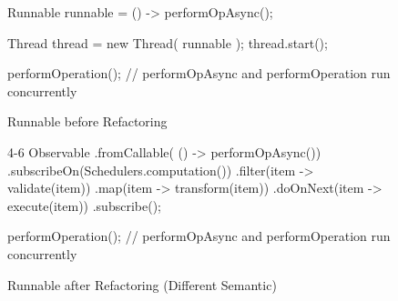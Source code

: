 \begin{figure}[H]
\begin{minipage}{0.48\textwidth}
\begin{sourcecode}
\begin{javacode}{}
Runnable runnable = () -> performOpAsync();

Thread thread = new Thread( runnable );
thread.start();

performOperation();
// performOpAsync and performOperation run concurrently
\end{javacode}
\caption{Runnable before Refactoring}
\label{code:con-runnable-before}
\end{sourcecode}
\end{minipage}\hspace{0.7cm}
\begin{minipage}{0.48\textwidth}
\begin{sourcecode}
\begin{javacode}{4-6}
Observable
        .fromCallable( () -> performOpAsync())
        .subscribeOn(Schedulers.computation())
        .filter(item -> validate(item))
        .map(item -> transform(item))
        .doOnNext(item -> execute(item))
        .subscribe();

performOperation();
// performOpAsync and performOperation run concurrently
\end{javacode}
\caption{Runnable after Refactoring (Different Semantic)}
\label{code:con-runnable-after}
\end{sourcecode}
\end{minipage}
\end{figure}